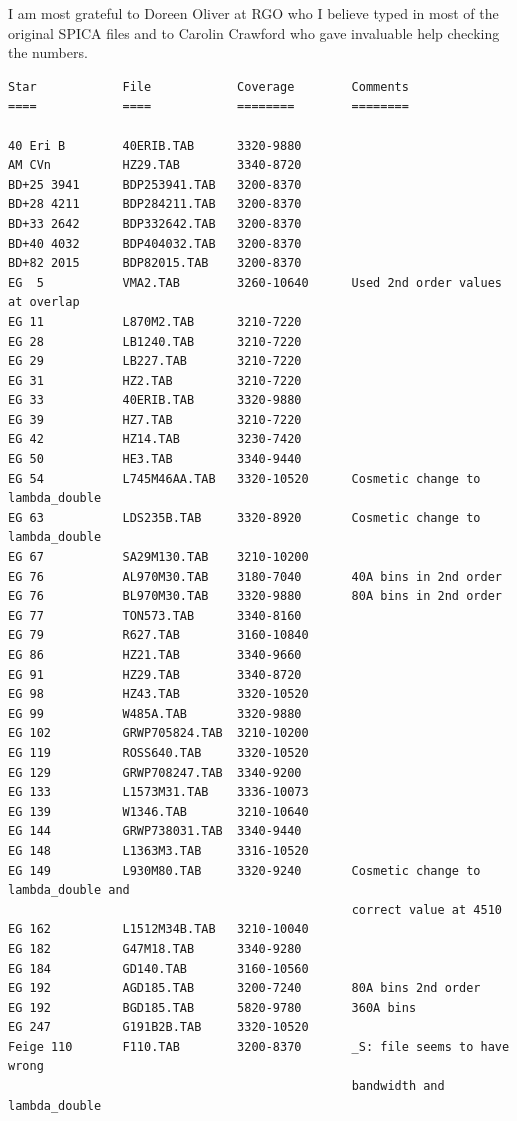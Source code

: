\documentclass[11pt,twoside]{article}
\begin{document}
   I am most grateful to Doreen Oliver at RGO who I believe typed in
   most of the original SPICA files and to Carolin Crawford who gave
   invaluable help checking the numbers.

\small\begin{verbatim}
Star            File            Coverage        Comments
====            ====            ========        ========

40 Eri B        40ERIB.TAB      3320-9880
AM CVn          HZ29.TAB        3340-8720
BD+25 3941      BDP253941.TAB   3200-8370
BD+28 4211      BDP284211.TAB   3200-8370
BD+33 2642      BDP332642.TAB   3200-8370
BD+40 4032      BDP404032.TAB   3200-8370
BD+82 2015      BDP82015.TAB    3200-8370
EG  5           VMA2.TAB        3260-10640      Used 2nd order values at overlap
EG 11           L870M2.TAB      3210-7220
EG 28           LB1240.TAB      3210-7220
EG 29           LB227.TAB       3210-7220
EG 31           HZ2.TAB         3210-7220
EG 33           40ERIB.TAB      3320-9880
EG 39           HZ7.TAB         3210-7220
EG 42           HZ14.TAB        3230-7420
EG 50           HE3.TAB         3340-9440
EG 54           L745M46AA.TAB   3320-10520      Cosmetic change to lambda_double
EG 63           LDS235B.TAB     3320-8920       Cosmetic change to lambda_double
EG 67           SA29M130.TAB    3210-10200
EG 76           AL970M30.TAB    3180-7040       40A bins in 2nd order
EG 76           BL970M30.TAB    3320-9880       80A bins in 2nd order
EG 77           TON573.TAB      3340-8160
EG 79           R627.TAB        3160-10840
EG 86           HZ21.TAB        3340-9660
EG 91           HZ29.TAB        3340-8720
EG 98           HZ43.TAB        3320-10520
EG 99           W485A.TAB       3320-9880
EG 102          GRWP705824.TAB  3210-10200
EG 119          ROSS640.TAB     3320-10520
EG 129          GRWP708247.TAB  3340-9200
EG 133          L1573M31.TAB    3336-10073
EG 139          W1346.TAB       3210-10640
EG 144          GRWP738031.TAB  3340-9440
EG 148          L1363M3.TAB     3316-10520
EG 149          L930M80.TAB     3320-9240       Cosmetic change to lambda_double and
                                                correct value at 4510
EG 162          L1512M34B.TAB   3210-10040
EG 182          G47M18.TAB      3340-9280
EG 184          GD140.TAB       3160-10560
EG 192          AGD185.TAB      3200-7240       80A bins 2nd order
EG 192          BGD185.TAB      5820-9780       360A bins
EG 247          G191B2B.TAB     3320-10520
Feige 110       F110.TAB        3200-8370       _S: file seems to have wrong
                                                bandwidth and lambda_double

\end{verbatim}
\end{document}
